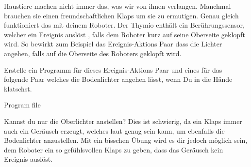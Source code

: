 


Haustiere machen nicht immer das,
was wir von ihnen verlangen.
Manchmal brauchen sie einen freundschaftlichen Klaps um sie zu ermutigen.
Genau gleich funktioniert das mit deinem Roboter.
Der Thymio enthält ein Berührungssensor, welcher ein Ereignis auslöst , falls dem Roboter kurz auf seine Oberseite geklopft wird. So bewirkt zum Beispiel das Ereignis-Aktions Paar 
dass die Lichter angehen, falls auf die Oberseite des Roboters geklopft wird.

Erstelle ein Programm für dieses Ereignis-Aktions Paar
und eines für das folgende Paar  welches die Bodenlichter angehen lässt,
wenn Du in die Hände klatschst.

{\raggedleft \hfill Program file }

Kannst du nur die Oberlichter anstellen?
Dies ist schwierig, da ein Klaps immer auch ein Geräusch erzeugt,
welches laut genug sein kann, um ebenfalls die Bodenlichter anzustellen.
Mit ein bisschen Übung wird es dir jedoch möglich sein,
dem Roboter ein so gefühlsvollen Klaps zu geben,
dass das Geräusch kein Ereignis auslöst.

